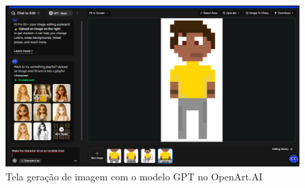 \begin{figure}[htbp]
    \centering
    \caption{\small Tela geração de imagem com o modelo GPT no OpenArt.AI}
    \label{fig:openArtModeloGPT}
    \includegraphics[width=1\linewidth]{figs/OpenArtAI/telaGPT.PNG}
\end{figure}